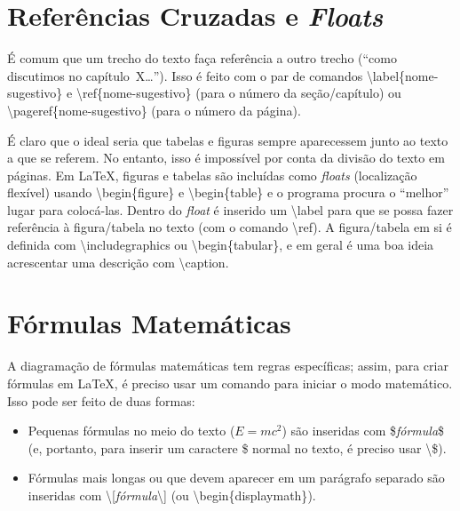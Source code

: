 \section{Referências Cruzadas e \emph{Floats}}

É comum que um trecho do texto faça referência a outro trecho (``como discutimos
no capítulo~X\ldots''). Isso é feito com o par de comandos
\textsf{\textbackslash{}label\{nome-sugestivo\}} e
\textsf{\textbackslash{}ref\{nome-sugestivo\}} (para o número da
seção/capítulo) ou \textsf{\textbackslash{}pageref\{nome-sugestivo\}}
(para o número da página).

É claro que o ideal seria que tabelas e figuras sempre aparecessem junto ao
texto a que se referem. No entanto, isso é impossível por conta da divisão
do texto em páginas. Em \LaTeX{}, figuras e tabelas são incluídas como
\emph{floats} (localização flexível) usando \textsf{\textbackslash{}begin\{figure\}}
e \textsf{\textbackslash{}begin\{table\}} e o programa procura o ``melhor''
lugar para colocá-las. Dentro do \emph{float} é inserido um
\textsf{\textbackslash{}label} para que se possa fazer referência à figura/tabela
no texto (com o comando \textsf{\textbackslash{}ref}). A figura/tabela em
si é definida com \textsf{\textbackslash{}includegraphics} ou
\textsf{\textbackslash{}begin\{tabular\}}, e em geral é uma boa ideia acrescentar
uma descrição com \textsf{\textbackslash{}caption}.

\section{Fórmulas Matemáticas}

A diagramação de fórmulas matemáticas tem regras específicas; assim, para
criar fórmulas em \LaTeX{}, é preciso usar um comando para iniciar o modo
matemático. Isso pode ser feito de duas formas:

\begin{itemize}
  \item Pequenas fórmulas no meio do texto ($E=mc^2$) são inseridas com
  \textsf{\$\textit{fórmula}\$} (e, portanto, para inserir um caractere \$
  normal no texto, é preciso usar \textsf{\textbackslash{}\$}).

  \item Fórmulas mais longas ou que devem aparecer em um parágrafo
  separado são inseridas com
  \textsf{\textbackslash{}[\textit{fórmula}\textbackslash{}]} (ou
  \textsf{\textbackslash{}begin\{displaymath\}}).
\end{itemize}

